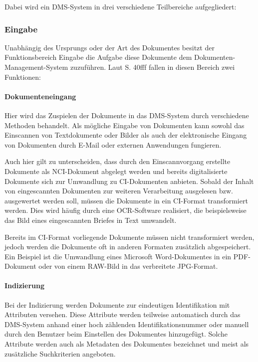 
Dabei wird ein \gls{DMS}-System in drei verschiedene Teilbereiche aufgegliedert:

\subsubsection{Eingabe}
Unabhängig des Ursprungs oder der Art des Dokumentes besitzt der Funktionsbereich Eingabe die Aufgabe diese Dokumente dem Dokumenten-Management-System zuzuführen.
Laut \cite{DMS08} S. 40fff fallen in diesen Bereich zwei Funktionen:

\paragraph{Dokumenteneingang}
Hier wird das Zuspielen der Dokumente in das \gls{DMS}-System durch verschiedene Methoden behandelt.
Als mögliche Eingabe von Dokumenten kann sowohl das Einscannen von Textdokumente oder Bilder als auch der elektronische Eingang von Dokumenten durch E-Mail oder externen Anwendungen fungieren.

Auch hier gilt zu unterscheiden, dass durch den Einscannvorgang erstellte Dokumente als \gls{NCI}-Dokument abgelegt werden und bereits digitalisierte Dokumente sich zur Umwandlung zu \gls{CI}-Dokumenten anbieten.
Sobald der Inhalt von eingescannten Dokumenten zur weiteren Verarbeitung ausgelesen bzw. ausgewertet werden soll, müssen die Dokumente in ein \gls{CI}-Format transformiert werden.
Dies wird häufig durch eine \gls{OCR}-Software realisiert, die beispielsweise das Bild eines eingescannten Briefes in Text umwandelt.

Bereits im \gls{CI}-Format vorliegende Dokumente müssen nicht transformiert werden, jedoch werden die Dokumente oft in anderen Formaten zusätzlich abgespeichert.
Ein Beispiel ist die Umwandlung eines Microsoft Word-Dokumentes in ein \gls{PDF}-Dokument oder von einem RAW-Bild in das verbreitete JPG-Format.

\paragraph{Indizierung}
Bei der Indizierung werden Dokumente zur eindeutigen Identifikation mit Attributen versehen.
Diese Attribute werden teilweise automatisch durch das \gls{DMS}-System anhand einer hoch zählenden Identifikationsnummer oder manuell durch den Benutzer beim Einstellen des Dokumentes hinzugefügt.
Solche Attribute werden auch als Metadaten des Dokumentes bezeichnet und meist als zusätzliche Suchkriterien angeboten.

